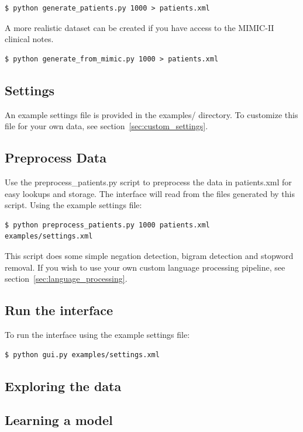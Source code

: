 \documentclass[12pt]{article}
\begin{document}
\begin{verbatim}
$ python generate_patients.py 1000 > patients.xml
\end{verbatim}

A more realistic dataset can be created if you have access to the MIMIC-II clinical notes.

\begin{verbatim}
$ python generate_from_mimic.py 1000 > patients.xml
\end{verbatim}

\subsection{Settings}
An example settings file is provided in the examples/ directory. To customize this file for your own data, see section~\ref{sec:custom_settings}.

\subsection{Preprocess Data}

Use the preprocess\_patients.py script to preprocess the data in patients.xml for easy lookups and storage. The interface will read from the files generated by this script. Using the example settings file:

\begin{verbatim}
$ python preprocess_patients.py 1000 patients.xml examples/settings.xml
\end{verbatim}

This script does some simple negation detection, bigram detection and stopword removal.
If you wish to use your own custom language processing pipeline, see section~\ref{sec:language_processing}.

\subsection{Run the interface}
To run the interface using the example settings file:

\begin{verbatim}
$ python gui.py examples/settings.xml
\end{verbatim}

\subsection{Exploring the data}

\subsection{Learning a model}
\end{document}
